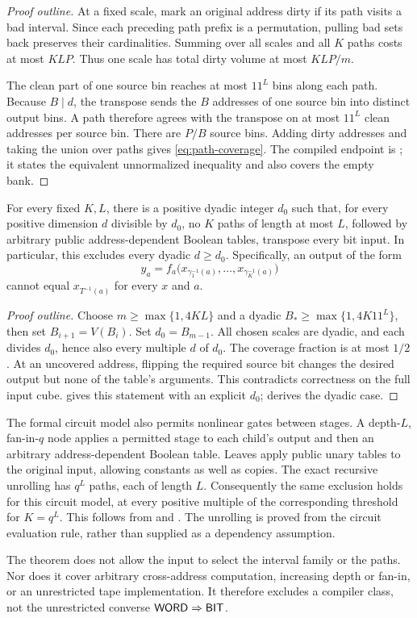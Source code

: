 \begin{proof}[Proof outline]
At a fixed scale, mark an original address dirty if its path visits a
bad interval. Since each preceding path prefix is a permutation, pulling
bad sets back preserves their cardinalities. Summing over all scales and
all $K$ paths costs at most $KLP$. Thus one scale has total dirty volume
at most $KLP/m$.

The clean part of one source bin reaches at most $11^L$ bins along each
path. Because $B\mid d$, the transpose sends the $B$ addresses of one
source bin into distinct output bins. A path therefore agrees with the
transpose on at most $11^L$ clean addresses per source bin. There are
$P/B$ source bins. Adding dirty addresses and taking the union over paths
gives \eqref{eq:path-coverage}. The compiled endpoint is
; it states the equivalent
unnormalized inequality and also covers the empty bank.
\end{proof}

\begin{corollary}
\label{cor:path-readout}
For every fixed $K,L$, there is a positive dyadic integer $d_0$ such
that, for every positive dimension $d$ divisible by $d_0$, no $K$ paths
of length at most $L$, followed by arbitrary public address-dependent
Boolean tables, transpose every bit input. In particular, this excludes
every dyadic $d\geq d_0$.
Specifically, an output of the form
\[
 y_a=f_a\bigl(x_{\gamma_1^{-1}(a)},\ldots,
             x_{\gamma_K^{-1}(a)}\bigr)
\]
cannot equal $x_{T^{-1}(a)}$ for every $x$ and $a$.
\end{corollary}

\begin{proof}[Proof outline]
Choose $m\geq\max\{1,4KL\}$ and a dyadic
$B_*\geq\max\{1,4K11^L\}$, then set $B_{i+1}=V(B_i)$.
Set $d_0=B_{m-1}$. All chosen scales are dyadic, and each divides
$d_0$, hence also every multiple $d$ of $d_0$. The coverage fraction is
at most $1/2$. At an uncovered address,
flipping the required source bit changes the desired output but none of
the table's arguments. This contradicts correctness on the full input
cube.  gives this
statement with an explicit $d_0$;
 derives the dyadic case.
\end{proof}

The formal circuit model also permits nonlinear gates between stages.
A depth-$L$, fan-in-$q$ node applies a permitted stage to each child's
output and then an arbitrary address-dependent Boolean table. Leaves
apply public unary tables to the original input, allowing constants as
well as copies. The exact recursive unrolling has $q^L$ paths, each of
length $L$. Consequently the same exclusion holds for this circuit
model, at every positive multiple of the corresponding threshold for
$K=q^L$. This follows from  and
. The unrolling is
proved from the circuit evaluation rule, rather than supplied as a
dependency assumption.

The theorem does not allow the input to select the interval family or
the paths. Nor does it cover arbitrary cross-address computation,
increasing depth or fan-in, or an unrestricted tape implementation.
It therefore excludes a compiler class, not the unrestricted converse
$\mathsf{WORD}\Rightarrow\mathsf{BIT}$.
